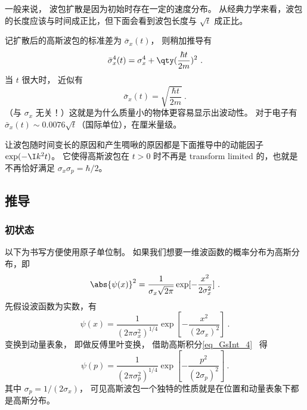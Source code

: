 一般来说， 波包扩散是因为初始时存在一定的速度分布。 从经典力学来看，波包的长度应该与时间成正比，但下面会看到波包长度与 $\sqrt{t}$ 成正比。

记扩散后的高斯波包的标准差为 $\bar\sigma_x(t)$， 则稍加推导有
\begin{equation}
\bar\sigma^4_x(t) = \sigma_x^4 + \qty(\frac{\hbar t}{2m})^2~.
\end{equation}
当 $t$ 很大时， 近似有
\begin{equation}
\bar\sigma_x(t) = \sqrt{\frac{\hbar t}{2m}}~.
\end{equation}
（与 $\sigma_x$ 无关！）这就是为什么质量小的物体更容易显示出波动性。 对于电子有 $\bar\sigma_x(t) \sim 0.0076\sqrt{t}$（国际单位），在厘米量级。

让波包随时间变长的原因和产生啁啾的原因都是下面推导中的动能因子 $\exp(-\I k^2 t)$。 它使得高斯波包在 $t > 0$ 时不再是 transform limited 的，也就是不再恰好满足 $\sigma_x \sigma_p = \hbar/2$。

\subsection{推导}
\subsubsection{初状态}

以下为书写方便使用原子单位制。 如果我们想要一维波函数的概率分布为高斯分布，即
\begin{equation}
\abs{\psi (x)}^2 = \frac{1}{\sigma_x \sqrt{2\pi}} \exp[-\frac{x^2}{2\sigma_x^2}]~.
\end{equation}
先假设波函数为实数，有
\begin{equation}
\psi (x) = \frac{1}{(2\pi\sigma_x^2)^{1/4}} \exp[-\frac{x^2}{(2\sigma_x)^2}]~.
\end{equation}
变换到动量表象， 即做反傅里叶变换， 借助高斯积分\autoref{eq_GsInt_4}~ 得
\begin{equation}
\psi(p) = \frac{1}{(2\pi\sigma_p^2)^{1/4}} \exp[-\frac{p^2}{(2\sigma_p)^2}]~.
\end{equation}
其中 $\sigma_p = 1/(2\sigma_x)$， 可见高斯波包一个独特的性质就是在位置和动量表象下都是高斯分布。

